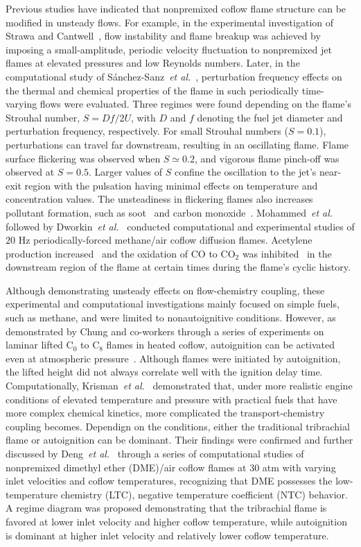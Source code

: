 \documentclass[review,3p,times]{elsarticle}
\begin{document}
Previous studies have indicated that nonpremixed coflow flame structure can be modified in unsteady flows.  For example, in the experimental investigation of Strawa and Cantwell~\cite{strawa89}, flow instability and flame breakup was achieved by imposing a small-amplitude, periodic velocity fluctuation to nonpremixed jet flames at elevated pressures and low Reynolds numbers.  Later, in the computational study of S\'{a}nchez-Sanz~\emph{et al.}~\cite{sanchezsanz10}, perturbation frequency effects on the thermal and chemical properties of the flame in such periodically time-varying flows were evaluated.  Three regimes were found depending on the flame's Strouhal number, $S = Df/2U$, with $D$ and $f$ denoting the fuel jet diameter and perturbation frequency, respectively.  For small Strouhal numbers ($S = 0.1$), perturbations can travel far downstream, resulting in an oscillating flame.  Flame surface flickering was observed when $S\simeq 0.2$, and vigorous flame pinch-off was observed at $S = 0.5$.  Larger values of $S$ confine the oscillation to the jet's near-exit region with the pulsation having minimal effects on temperature and concentration values.  The unsteadiness in flickering flames also increases pollutant formation, such as soot~\cite{shaddix94} and carbon monoxide~\cite{skaggs96}.  Mohammed~\emph{et al.}~\cite{mohammed98} followed by Dworkin~\emph{et al.}~\cite{dworkin07} conducted computational and experimental studies of $20$ Hz periodically-forced methane/air coflow diffusion flames.  Acetylene production increased~\cite{mohammed98} and the oxidation of CO to CO$_2$ was inhibited~\cite{dworkin07} in the downstream region of the flame at certain times during the flame's cyclic history.       

Although demonstrating unsteady effects on flow-chemistry coupling, these experimental and computational investigations mainly focused on simple fuels, such as methane, and were limited to nonautoignitive conditions.  \textcolor{Rev1}{However, as demonstrated by Chung and co-workers through a series of experiments on laminar lifted C{$_0$} to C{$_8$} flames in heated coflow, autoignition can be activated even at atmospheric pressure~\cite{choi10,ainoman15}.  Although flames were initiated by autoignition, the lifted height did not always correlate well with the ignition delay time.  Computationally, Krisman~\emph{et al.}~\cite{krisman14} demonstrated that, under more realistic engine conditions of elevated temperature and pressure with practical fuels that have more complex chemical kinetics, more complicated the transport-chemistry coupling becomes.  Dependign on the conditions, either the traditional tribrachial flame or autoignition can be dominant.}  Their findings were confirmed and further discussed by Deng~\emph{et al.}~\cite{deng15,deng15b} through a series of computational studies of nonpremixed dimethyl ether (DME)/air coflow flames at $30$ atm with varying inlet velocities and coflow temperatures, recognizing that DME possesses the low-temperature chemistry (LTC), negative temperature coefficient (NTC) behavior.  A regime diagram was proposed demonstrating that the tribrachial flame is favored at lower inlet velocity and higher coflow temperature, while autoignition is dominant at higher inlet velocity and relatively lower coflow temperature.
\end{document}

